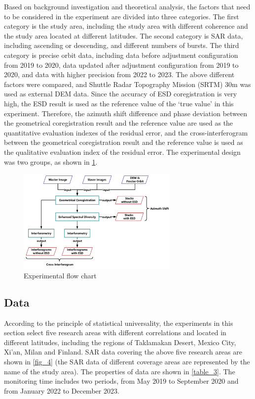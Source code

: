 \documentclass[preprint, authoryear]{elsarticle}
\begin{document}
Based on background investigation and theoretical analysis, the factors that need to be considered in the experiment are divided into three categories. The first category is the study area, including the study area with different coherence and the study area located at different latitudes. The second category is SAR data, including ascending or descending, and different numbers of bursts. The third category is precise orbit data, including data before adjustment configuration from 2019 to 2020, data updated after adjustment configuration from 2019 to 2020, and data with higher precision from 2022 to 2023. The above different factors were compared, and Shuttle Radar Topography Mission (SRTM) 30m was used as external DEM data. Since the accuracy of ESD coregistration is very high, the ESD result is used as the reference value of the ‘true value’ in this experiment. Therefore, the azimuth shift difference and phase deviation between the geometrical coregistration result and the reference value are used as the quantitative evaluation indexes of the residual error, and the cross-interferogram between the geometrical coregistration result and the reference value is used as the qualitative evaluation index of the residual error. The experimental design was two groups, as shown in \ref{fig_3}. \par

\begin{figure}
	\centering
	\includegraphics[width=0.7\textwidth]{figure/Experimental flow chart.png}
	\caption{Experimental flow chart}
	\label{fig_3}%
\end{figure}

\subsection{Data}

According to the principle of statistical universality, the experiments in this section select five research areas with different correlations and located in different latitudes, including the regions of Taklamakan Desert, Mexico City, Xi’an, Milan and Finland. SAR data covering the above five research areas are shown in \ref{fig_4} (the SAR data of different coverage areas are represented by the name of the study area). The properties of data are shown in \ref{table_3}. The monitoring time includes two periods, from May 2019 to September 2020 and from January 2022 to December 2023. \par
\end{document}

